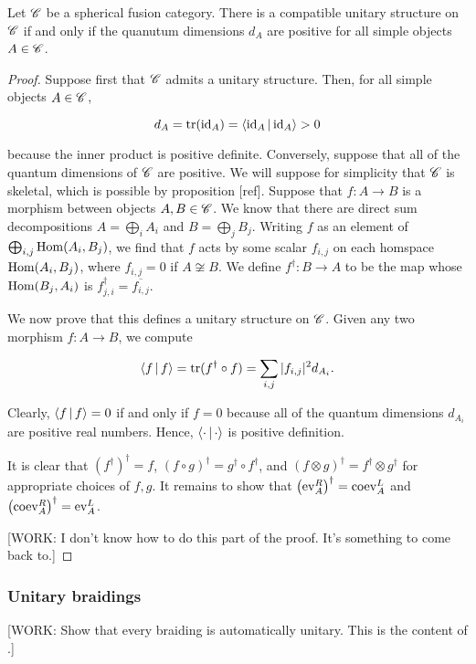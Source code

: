 \begin{proposition} Let $\mathscr{C}$ be a spherical fusion category. There is a compatible unitary structure on $\mathscr{C}$ if and only if  the quanutum dimensions $d_A$ are positive for all simple objects $A\in \mathscr{C}$. 
\end{proposition}
\begin{proof} Suppose first that $\mathscr{C}$ admits a unitary structure. Then, for all simple objects $A\in \mathscr{C}$,

$$d_A=\operatorname{tr}(\operatorname{id}_{A})=\Braket{\operatorname{id}_{A} | \operatorname{id}_{A}}>0$$

because the inner product is positive definite. Conversely, suppose that all of the quantum dimensions of $\mathscr{C}$ are positive. We will suppose for simplicity that $\mathscr{C}$ is skeletal, which is possible by proposition [ref]. Suppose that $f:A\to B$ is a morphism between objects $A,B\in \mathscr{C}$. We know that there are direct sum decompositions $A=\bigoplus_{i}A_i$ and $B=\bigoplus_{j}B_j$. Writing $f$ as an element of $\bigoplus_{i,j}\operatorname{Hom}(A_i,B_j)$, we find that $f$ acts by some scalar $f_{i,j}$ on each homspace $\operatorname{Hom}(A_i,B_j)$, where $f_{i,j}=0$ if $A\not\cong B$. We define $f^{\dagger}: B\to A$ to be the map whose $\operatorname{Hom}(B_j,A_i)$ is $f_{j,i}^{\dagger}=\overline{f_{i,j}}$.

We now prove that this defines a unitary structure on $\mathscr{C}$. Given any two morphism $f:A\to B$, we compute

$$\Braket{f|f}=\operatorname{tr}(f^{\dagger}\circ f)=\sum_{i,j}|f_{i,j}|^2d_{A_i}.$$

Clearly, $\Braket{f|f}=0$ if and only if $f=0$ because all of the quantum dimensions $d_{A_i}$ are positive real numbers. Hence, $\Braket{\cdot|\cdot}$ is positive definition.

It is clear that $(f^{\dagger})^{\dagger}=f$, $(f\circ g)^{\dagger}=g^{\dagger}\circ f^{\dagger}$,  and $(f\otimes g)^{\dagger}=f^{\dagger}\otimes g^{\dagger}$ for appropriate choices of $f,g$. It remains to show that $\left(\operatorname{ev}^R_{A}\right)^{\dagger}=\operatorname{coev}^{L}_A$ and $\left(\operatorname{coev}^{R}_A\right)^{\dagger}=\operatorname{ev}^L_A$.

[WORK: I don't know how to do this part of the proof. It's something to come back to.]
\end{proof}

\subsubsection{Unitary braidings}

[WORK: Show that every braiding is automatically unitary. This is the content of \cite{galindo2014braided}.]

